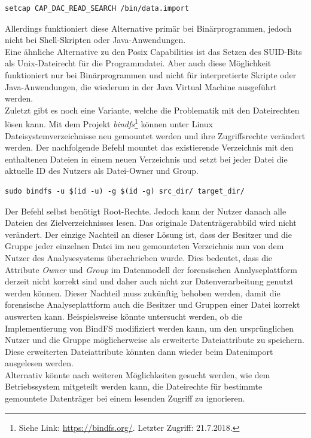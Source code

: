 \begin{lstlisting}[label={lst:pos_cap_command},caption= Befehl zum Setzen von Posix Capabilities,captionpos=b,frame=single,style=customshell]
setcap CAP_DAC_READ_SEARCH /bin/data.import
\end{lstlisting}

\noindent
Allerdings funktioniert diese Alternative primär bei Binärprogrammen, jedoch nicht bei Shell-Skripten oder Java-Anwendungen.\\
Eine ähnliche Alternative zu den Posix Capabilities ist das Setzen des SUID-Bits als Unix-Dateirecht für die Programmdatei. Aber auch diese Möglichkeit funktioniert nur bei Binärprogrammen und nicht für interpretierte Skripte oder Java-Anwendungen, die wiederum in der Java Virtual Machine ausgeführt werden.\\

\noindent
Zuletzt gibt es noch eine Variante, welche die Problematik mit den Dateirechten lösen kann. 
Mit dem Projekt \textit{bindfs}\footnote{Siehe Link: \url{https://bindfs.org/}. Letzter Zugriff: 21.7.2018.} können unter Linux Dateisystemverzeichnisse neu gemountet werden und ihre Zugriffsrechte verändert werden. Der nachfolgende Befehl mountet das existierende Verzeichnis mit den enthaltenen Dateien in einem neuen Verzeichnis und setzt bei jeder Datei die aktuelle ID des Nutzers als Datei-Owner und Group. 
\begin{lstlisting}[label={lst:bindfs_command},caption= Nutzung von Bindfs zum Ändern von Dateirechten,captionpos=b,frame=single,style=customshell]
sudo bindfs -u $(id -u) -g $(id -g) src_dir/ target_dir/
\end{lstlisting}
Der Befehl selbst benötigt Root-Rechte. Jedoch kann der Nutzer danach alle Dateien des Zielverzeichnisses lesen. Das originale Datenträgerabbild wird nicht verändert. Der einzige Nachteil an dieser Lösung ist, dass der Besitzer und die Gruppe jeder einzelnen Datei im neu gemounteten Verzeichnis nun von dem Nutzer des Analysesystems überschrieben wurde.
Dies bedeutet, dass die Attribute \textit{Owner} und \textit{Group} im Datenmodell der forensischen Analyseplattform derzeit nicht korrekt sind und daher auch nicht zur Datenverarbeitung genutzt werden können. Dieser Nachteil muss zukünftig behoben werden, damit die forensische Analyseplattform auch die Besitzer und Gruppen einer Datei korrekt auswerten kann.
Beispielsweise könnte untersucht werden, ob die Implementierung von BindFS modifiziert werden kann, um den ursprünglichen Nutzer und die Gruppe möglicherweise als erweiterte Dateiattribute zu speichern. Diese erweiterten Dateiattribute könnten dann wieder beim Datenimport ausgelesen werden.\\
Alternativ könnte nach weiteren Möglichkeiten gesucht werden, wie dem Betriebssystem
mitgeteilt werden kann, die Dateirechte für bestimmte gemountete Datenträger bei einem lesenden Zugriff zu ignorieren.

